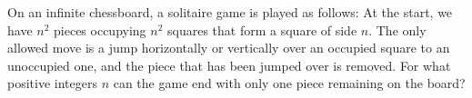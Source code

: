 On an infinite chessboard, a solitaire game is played as follows: At the start, we have $n^2$ pieces occupying $n^2$ squares that form a square of side $n$. The only allowed move is a jump horizontally or vertically over an occupied square to an unoccupied one, and the piece that has been jumped over is removed. For what positive integers $n$ can the game end with only one piece remaining on the board?
